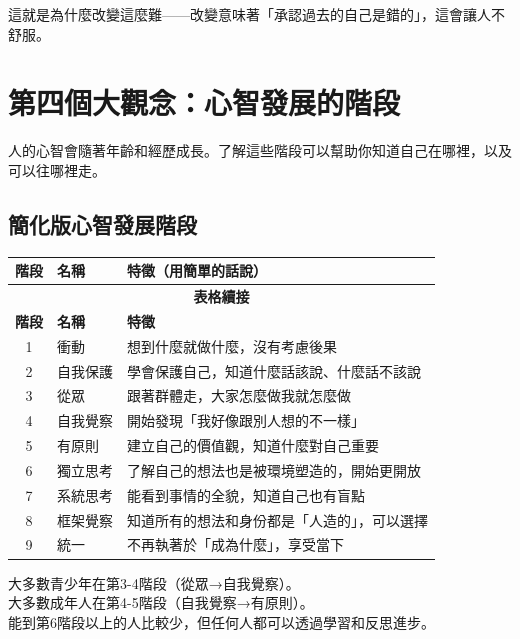 \documentclass[12pt,a4paper]{article}
\begin{document}
這就是為什麼改變這麼難——改變意味著「承認過去的自己是錯的」，這會讓人不舒服。

\section{第四個大觀念：心智發展的階段}

人的心智會隨著年齡和經歷成長。了解這些階段可以幫助你知道自己在哪裡，以及可以往哪裡走。

\subsection{簡化版心智發展階段}

\begin{longtable}{clp{8cm}}
\toprule
\textbf{階段} & \textbf{名稱} & \textbf{特徵（用簡單的話說）} \\
\midrule
\endfirsthead

\multicolumn{3}{c}{\textbf{表格續接}} \\
\toprule
\textbf{階段} & \textbf{名稱} & \textbf{特徵} \\
\midrule
\endhead

\bottomrule
\endfoot

1 & 衝動 & 想到什麼就做什麼，沒有考慮後果 \\
\midrule
2 & 自我保護 & 學會保護自己，知道什麼話該說、什麼話不該說 \\
\midrule
3 & 從眾 & 跟著群體走，大家怎麼做我就怎麼做 \\
\midrule
4 & 自我覺察 & 開始發現「我好像跟別人想的不一樣」 \\
\midrule
5 & 有原則 & 建立自己的價值觀，知道什麼對自己重要 \\
\midrule
6 & 獨立思考 & 了解自己的想法也是被環境塑造的，開始更開放 \\
\midrule
7 & 系統思考 & 能看到事情的全貌，知道自己也有盲點 \\
\midrule
8 & 框架覺察 & 知道所有的想法和身份都是「人造的」，可以選擇 \\
\midrule
9 & 統一 & 不再執著於「成為什麼」，享受當下 \\
\bottomrule
\end{longtable}

\begin{tcolorbox}[colback=emergency_blue!5!white, colframe=emergency_blue, title=\textbf{你可能在哪裡？}]
大多數青少年在第3-4階段（從眾→自我覺察）。\\
大多數成年人在第4-5階段（自我覺察→有原則）。\\
能到第6階段以上的人比較少，但任何人都可以透過學習和反思進步。
\end{tcolorbox}
\end{document}
